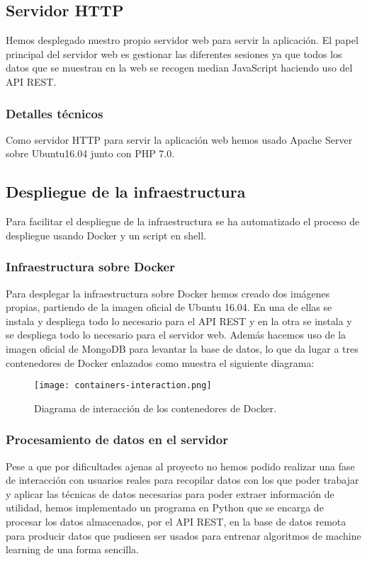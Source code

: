 \documentclass[11pt,spanish]{article}
\begin{document}
\subsection{Servidor HTTP}
Hemos desplegado nuestro propio servidor web para servir la aplicación. El papel principal del servidor web es gestionar las diferentes sesiones ya que todos los datos que se muestran en la web se recogen median JavaScript haciendo uso del API REST. 

\subsubsection{Detalles técnicos}
Como servidor HTTP para servir la aplicación web hemos usado Apache Server sobre Ubuntu16.04 junto con PHP 7.0.

\subsection{Despliegue de la infraestructura}

Para facilitar el despliegue de la infraestructura se ha automatizado el proceso de despliegue usando Docker y un script en shell.

\subsubsection{Infraestructura sobre Docker}
Para desplegar la infraestructura sobre Docker hemos creado dos imágenes propias, partiendo de la imagen oficial de Ubuntu 16.04. En una de ellas se instala y despliega todo lo necesario para el API REST y en la otra se instala y se despliega todo lo necesario para el servidor web. Además hacemos uso de la imagen oficial de MongoDB para levantar la base de datos, lo que da lugar a tres contenedores de Docker enlazados como muestra el siguiente diagrama:

\begin{figure}[H]
  \centering
  \texttt{[image: containers-interaction.png]}
  \caption{Diagrama de interacción de los contenedores de Docker.}
\end{figure}
\newpage

\subsubsection{Procesamiento de datos en el servidor}

Pese a que por dificultades ajenas al proyecto no hemos podido realizar una fase de interacción con usuarios reales para recopilar datos con los que poder trabajar y aplicar las técnicas de datos necesarias para poder extraer información de utilidad, hemos implementado un programa en Python que se encarga de procesar los datos almacenados, por el API REST, en la base de datos remota para producir datos que pudiesen ser usados para entrenar algoritmos de machine learning de una forma sencilla.
\newpage
\end{document}
